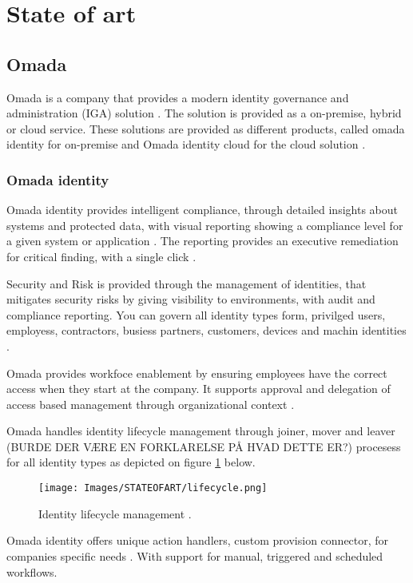 \section{State of art}

\subsection{Omada}
Omada is a company that provides a modern identity governance and administration (IGA) solution \citep{omada}. The solution is provided as a on-premise, hybrid or cloud service. These solutions are provided as different products, called omada identity for on-premise and Omada identity cloud for the cloud solution \citep{omada}.

\subsubsection{Omada identity}
Omada identity provides intelligent compliance, through detailed insights about systems and protected data, with visual reporting showing a compliance level for a given system or application \citep{omada}. The reporting provides an executive remediation for critical finding, with a single click \citep{omada}.

Security and Risk is provided through the management of identities, that mitigates security risks by giving visibility to environments, with audit and compliance reporting. You can govern all identity types form, privilged users, employess, contractors, busiess partners, customers, devices and machin identities \citep{omada}.

Omada provides workfoce enablement by ensuring employees have the correct access when they start at the company. It supports approval and delegation of access based management through organizational context \citep{omada}.

Omada handles identity lifecycle management through joiner, mover and leaver (BURDE DER VÆRE EN FORKLARELSE PÅ HVAD DETTE ER?) procesess for all identity types as depicted on figure \ref{lifecycle management} below.

\begin{figure}[H]
	\centering
	\texttt{[image: Images/STATEOFART/lifecycle.png]}
	\caption{Identity lifecycle management \citep{omada}. }
	\label{lifecycle management}
\end{figure}

Omada identity offers unique action handlers, custom provision connector, for companies specific needs \citep{omada}. With support for manual, triggered and scheduled workflows.

